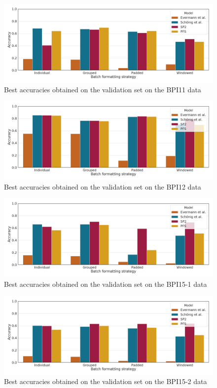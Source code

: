 \begin{figure}
    \centering
    \includegraphics[width=\textwidth]{gfx/bpic2011/accuracies.png}
    \caption{Best accuracies obtained on the validation set on the BPI11 data}
    \label{fig:max-accuracies-bpic2011}
\end{figure}
\begin{figure}
    \centering
    \includegraphics[width=\textwidth]{gfx/bpic2012/accuracies.png}
    \caption{Best accuracies obtained on the validation set on the BPI12 data}
    \label{fig:max-accuracies-bpic2012}
\end{figure}
\begin{figure}
    \centering
    \includegraphics[width=\textwidth]{gfx/bpic2015_1/accuracies.png}
    \caption{Best accuracies obtained on the validation set on the BPI15-1 data}
    \label{fig:max-accuracies-bpic2015-1}
\end{figure}
\begin{figure}
    \centering
    \includegraphics[width=\textwidth]{gfx/bpic2015_2/accuracies.png}
    \caption{Best accuracies obtained on the validation set on the BPI15-2 data}
    \label{fig:max-accuracies-bpic2015-2}
\end{figure}
